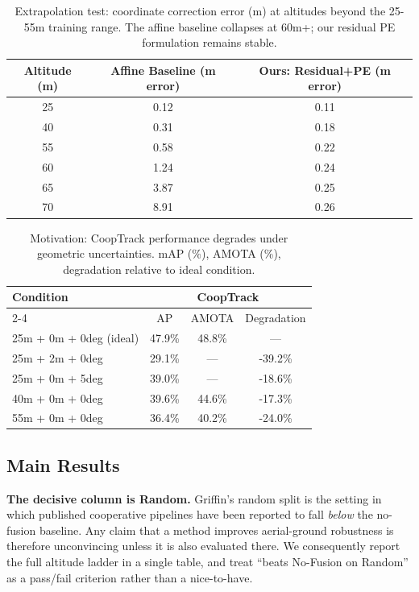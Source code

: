 \documentclass[9.5pt,twocolumn,a4paper]{IEEEtran}
\begin{document}
\begin{table}[htbp]
    \centering
    \caption{Extrapolation test: coordinate correction error (m) at altitudes beyond the 25-55m training range. The affine baseline collapses at 60m+; our residual PE formulation remains stable.}
    \begin{tabular}{c|c|c}
        \toprule
        Altitude (m) & Affine Baseline (m error) & Ours: Residual+PE (m error) \\
        \midrule
        25 & 0.12 & 0.11 \\
        40 & 0.31 & 0.18 \\
        55 & 0.58 & 0.22 \\
        60 & 1.24 & 0.24 \\
        65 & 3.87 & 0.25 \\
        70 & 8.91 & 0.26 \\
        \bottomrule
    \end{tabular}
    \label{tab:extrapolation}
\end{table}

\begin{table}[htbp]
    \centering
    \caption{Motivation: CoopTrack performance degrades under geometric uncertainties. mAP (\%), AMOTA (\%), degradation relative to ideal condition.}
    \begin{tabular}{l|c|c|c}
        \toprule
        \multirow{2}{*}{Condition} & \multicolumn{3}{c}{CoopTrack} \\
        \cline{2-4}
        & AP & AMOTA & Degradation \\
        \midrule
        25m + 0m + 0deg (ideal) & 47.9\% & 48.8\% & --- \\
        25m + 2m + 0deg & 29.1\% & --- & -39.2\% \\
        25m + 0m + 5deg & 39.0\% & --- & -18.6\% \\
        40m + 0m + 0deg & 39.6\% & 44.6\% & -17.3\% \\
        55m + 0m + 0deg & 36.4\% & 40.2\% & -24.0\% \\
        \bottomrule
    \end{tabular}
    \label{tab:motivation}
\end{table}

\subsection{Main Results}

\noindent\textbf{The decisive column is Random.} Griffin's random split is the setting in which published cooperative pipelines have been reported to fall \emph{below} the no-fusion baseline. Any claim that a method improves aerial-ground robustness is therefore unconvincing unless it is also evaluated there. We consequently report the full altitude ladder in a single table, and treat ``beats No-Fusion on Random'' as a pass/fail criterion rather than a nice-to-have.
\end{document}
